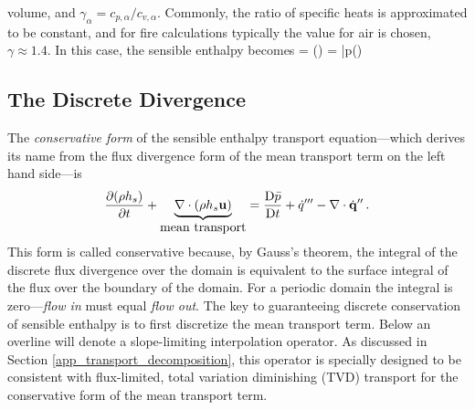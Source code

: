 


volume, and $\gamma_\alpha = c_{p,\alpha}/c_{v,\alpha}$.  Commonly, the ratio of specific heats is approximated to be constant,
and for fire calculations typically the value for air is chosen, $\gamma \approx 1.4$.  In this case, the sensible enthalpy
becomes
{} = \rho {} \left(\right) =
\bar{p}\left(\right)

\subsection{The Discrete Divergence}
\label{discrete_divergence}

The \emph{conservative form} of the sensible enthalpy transport equation---which derives its name from the flux divergence form of
the mean transport term on the left hand side---is
\begin{equation}
\label{eqn_conservative_enthalpy}
\frac{\partial (\rho h_s)}{\partial t} + \underbrace{\nabla\cdot(\rho h_s \mathbf{u})}_{\mbox{mean transport}} = \frac{\mbox{D} \bar{p}}{\mbox{D} t}
+ \dot{q}^{\prime\prime\prime} - \nabla\cdot \dot{\mathbf{q}}^{\prime\prime} \,\mbox{.}
\end{equation}
This form is called conservative because, by Gauss's theorem, the integral of the discrete flux divergence over the domain is
equivalent to the surface integral of the flux over the boundary of the domain.  For a periodic domain the integral is
zero---\emph{flow in} must equal \emph{flow out}. The key to guaranteeing discrete conservation of sensible enthalpy is to first
discretize the mean transport term.  Below an overline will denote a slope-limiting interpolation operator.  As discussed in
Section \ref{app_transport_decomposition}, this operator is specially designed to be consistent with flux-limited, total variation
diminishing (TVD) transport for the conservative form of the mean transport term.

